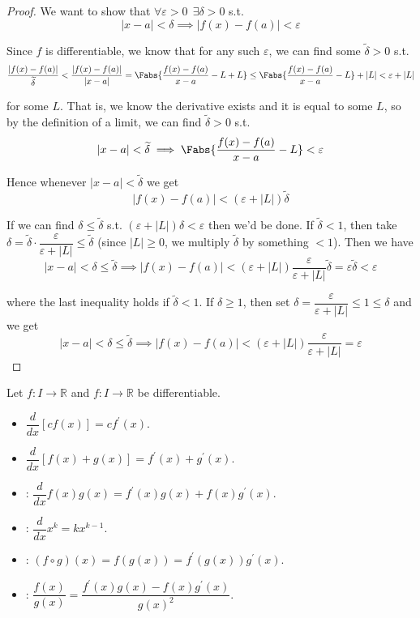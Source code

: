 \documentclass{article}
\begin{document}
\begin{proof}
  We want to show that $\forall \varepsilon > 0 ~~ \exists \delta > 0$ s.t.
  \[
    |x - a| < \delta \implies |f(x) - f(a)| < \varepsilon
  \]

  Since $f$ is differentiable, we know that for any such $\varepsilon$, we can find some $\widetilde{\delta} > 0$ s.t.
  \[
    \dfrac{|f(x) - f(a)|}{\widetilde{\delta}}
    < \dfrac{|f(x) - f(a)|}{|x - a|}
    = \Fabs{\dfrac{f(x) - f(a)}{x - a} - L + L}
    \le \Fabs{\dfrac{f(x) - f(a)}{x - a} - L} + |L|
    < \varepsilon + |L|
  \]

  for some $L$. That is, we know the derivative exists and it is equal to some $L$, so by the definition of a limit, we can find $\widetilde{\delta} > 0$ s.t.
  \[
    |x - a| < \widetilde{\delta} \implies \Fabs{\dfrac{f(x) - f(a)}{x - a} - L} < \varepsilon
  \]

  Hence whenever $|x - a| < \widetilde{\delta}$ we get
  \[
    |f(x) - f(a)| < \left(\varepsilon + |L|\right) \widetilde{\delta}
  \]

  If we can find $\delta \le \widetilde{\delta}$ s.t. $\left(\varepsilon + |L|\right)\delta < \varepsilon$ then we'd be done. If $\widetilde{\delta} < 1$, then take $\delta = \widetilde{\delta} \cdot \dfrac{\varepsilon}{\varepsilon + |L|} \le \widetilde{\delta}$ (since $|L| \ge 0$, we multiply $\widetilde{\delta}$ by something $< 1$). Then we have
  \[
    |x - a| < \delta \le \widetilde{\delta}
    \implies
    |f(x) - f(a)|
    <
    \left(\varepsilon + |L|\right) \dfrac{\varepsilon}{\varepsilon + |L|} \widetilde{\delta}
    = \varepsilon \widetilde{\delta}
    < \varepsilon
  \]

  where the last inequality holds if $\widetilde{\delta} < 1$. If $\delta \ge 1$, then set $\delta = \dfrac{\varepsilon}{\varepsilon + |L|} \le 1 \le \delta$ and we get
  \[
    |x - a| < \delta \le \widetilde{\delta}
    \implies
    |f(x) - f(a)|
    <
    \left(\varepsilon + |L|\right) \dfrac{\varepsilon}{\varepsilon + |L|}
    = \varepsilon
  \]
\end{proof}

\begin{theorem}
  Let $f: I \to \mathbb{R}$ and $f: I \to \mathbb{R}$ be differentiable.
  \begin{itemize}[label=$\bullet$]
    \item $\dfrac{d}{dx} [c f(x)] = c f^\prime(x)$.
    \item $\dfrac{d}{dx} [f(x) + g(x)] = f^\prime(x) + g^\prime(x)$.
    \item {}: $\dfrac{d}{dx} f(x) g(x) = f^\prime(x) g(x) + f(x) g^\prime(x)$.
    \item {}: $\dfrac{d}{dx} x^k = k x^{k - 1}$.
    \item {}: $(f \circ g)(x) = f(g(x)) = f^\prime(g(x)) g^\prime(x)$.
    \item {}: $\dfrac{f(x)}{g(x)} = \dfrac{f^\prime(x) g(x) - f(x) g^\prime(x)}{g(x)^2}$.
  \end{itemize}
\end{theorem}
\end{document}

